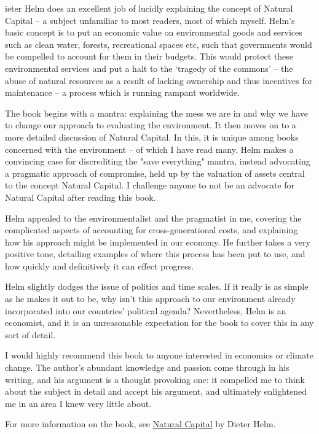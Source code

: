 \label{ch:natural-capital}

{\flushright{}}
\smallskip

   ieter Helm does an excellent job of lucidly explaining the concept of
   Natural Capital -- a subject unfamiliar to most readers, most of which
   myself. Helm's basic concept is to put an economic value on
   environmental goods and services such as clean water, forests,
   recreational spaces etc, such that governments would be compelled to
   account for them in their budgets. This would protect these
   environmental services and put a halt to the `tragedy of the commons'
   -- the abuse of natural resources as a result of lacking ownership and
   thus incentives for maintenance -- a process which is running rampant
   worldwide.

   The book begins with a mantra: explaining the mess we are in and why we
   have to change our approach to evaluating the environment. It then
   moves on to a more detailed discussion of Natural Capital. In this, it
   is unique among books concerned with the environment -- of which I have
   read many. Helm makes a convincing case for discrediting the "save
   everything" mantra, instead advocating a pragmatic approach of
   compromise, held up by the valuation of assets central to the concept
   Natural Capital. I challenge anyone to not be an advocate for Natural
   Capital after reading this book.

   Helm appealed to the environmentalist and the pragmatist in me,
   covering the complicated aspects of accounting for cross-generational
   costs, and explaining how his approach might be implemented in our
   economy. He further takes a very positive tone, detailing examples of
   where this process has been put to use, and how quickly and
   definitively it can effect progress.

   Helm slightly dodges the issue of politics and time scales. If it
   really is as simple as he makes it out to be, why isn't this approach
   to our environment already incorporated into our countries' political
   agenda? Nevertheless, Helm is an economist, and it is an unreasonable
   expectation for the book to cover this in any sort of detail.

   I would highly recommend this book to anyone interested in economics or
   climate change. The author's abundant knowledge and passion come
   through in his writing, and his argument is a thought provoking one: it
   compelled me to think about the subject in detail and accept his
   argument, and ultimately enlightened me in an area I knew very little
   about.

   For more information on the book, see \href{https://www.goodreads.com/book/show/23168504-natural-capital}{Natural Capital} by Dieter
   Helm.

